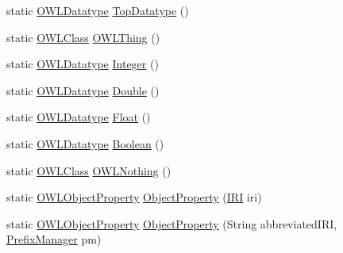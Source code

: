 \begin{DoxyCompactItemize}
\item 
static \hyperlink{interfaceorg_1_1semanticweb_1_1owlapi_1_1model_1_1_o_w_l_datatype}{O\-W\-L\-Datatype} \hyperlink{classorg_1_1semanticweb_1_1owlapi_1_1apibinding_1_1_o_w_l_functional_syntax_factory_a2a5e979bb4d9a928b46955eb98bfebed}{Top\-Datatype} ()
\item 
static \hyperlink{interfaceorg_1_1semanticweb_1_1owlapi_1_1model_1_1_o_w_l_class}{O\-W\-L\-Class} \hyperlink{classorg_1_1semanticweb_1_1owlapi_1_1apibinding_1_1_o_w_l_functional_syntax_factory_a0eed263b4beffee0e307c0029215f45a}{O\-W\-L\-Thing} ()
\item 
static \hyperlink{interfaceorg_1_1semanticweb_1_1owlapi_1_1model_1_1_o_w_l_datatype}{O\-W\-L\-Datatype} \hyperlink{classorg_1_1semanticweb_1_1owlapi_1_1apibinding_1_1_o_w_l_functional_syntax_factory_a8ccaa0a728643c143010708c64addbcb}{Integer} ()
\item 
static \hyperlink{interfaceorg_1_1semanticweb_1_1owlapi_1_1model_1_1_o_w_l_datatype}{O\-W\-L\-Datatype} \hyperlink{classorg_1_1semanticweb_1_1owlapi_1_1apibinding_1_1_o_w_l_functional_syntax_factory_ae96484aa6c3a748cfd6940a004c37e85}{Double} ()
\item 
static \hyperlink{interfaceorg_1_1semanticweb_1_1owlapi_1_1model_1_1_o_w_l_datatype}{O\-W\-L\-Datatype} \hyperlink{classorg_1_1semanticweb_1_1owlapi_1_1apibinding_1_1_o_w_l_functional_syntax_factory_a6585ba0625c63114e59d3e8829b74d3f}{Float} ()
\item 
static \hyperlink{interfaceorg_1_1semanticweb_1_1owlapi_1_1model_1_1_o_w_l_datatype}{O\-W\-L\-Datatype} \hyperlink{classorg_1_1semanticweb_1_1owlapi_1_1apibinding_1_1_o_w_l_functional_syntax_factory_a2d1c5b3a433188f747ca4b0261f2a46b}{Boolean} ()
\item 
static \hyperlink{interfaceorg_1_1semanticweb_1_1owlapi_1_1model_1_1_o_w_l_class}{O\-W\-L\-Class} \hyperlink{classorg_1_1semanticweb_1_1owlapi_1_1apibinding_1_1_o_w_l_functional_syntax_factory_a40b7afc540feb22f33650d0c7c1afc86}{O\-W\-L\-Nothing} ()
\item 
static \hyperlink{interfaceorg_1_1semanticweb_1_1owlapi_1_1model_1_1_o_w_l_object_property}{O\-W\-L\-Object\-Property} \hyperlink{classorg_1_1semanticweb_1_1owlapi_1_1apibinding_1_1_o_w_l_functional_syntax_factory_a0482b69139c310dde5470b19242a39e0}{Object\-Property} (\hyperlink{classorg_1_1semanticweb_1_1owlapi_1_1model_1_1_i_r_i}{I\-R\-I} iri)
\item 
static \hyperlink{interfaceorg_1_1semanticweb_1_1owlapi_1_1model_1_1_o_w_l_object_property}{O\-W\-L\-Object\-Property} \hyperlink{classorg_1_1semanticweb_1_1owlapi_1_1apibinding_1_1_o_w_l_functional_syntax_factory_ad625d61c02cb338c0e49d07028f83e53}{Object\-Property} (String abbreviated\-I\-R\-I, \hyperlink{interfaceorg_1_1semanticweb_1_1owlapi_1_1model_1_1_prefix_manager}{Prefix\-Manager} pm)

\end{DoxyCompactItemize}
